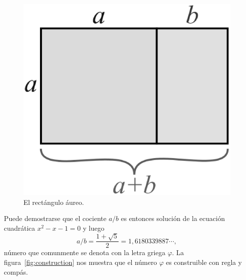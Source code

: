 \begin{figure}
   \centering
   \includegraphics[scale=0.2]{images/golden}
   \caption{El rectángulo áureo.}
   \label{fig:golden}
\end{figure}

Puede demostrarse que el cociente $a/b$ es entonces solución de la ecuación
cuadrática $x^2-x-1=0$ y luego 
\[
	a/b=\frac{1+\sqrt{5}}{2}=1,6180339887\cdots,
\]
número que comunmente se denota con la letra griega $\varphi$.  La
figura~\ref{fig:construction} nos muestra que el número $\varphi$ es
construible con regla y compás. 

